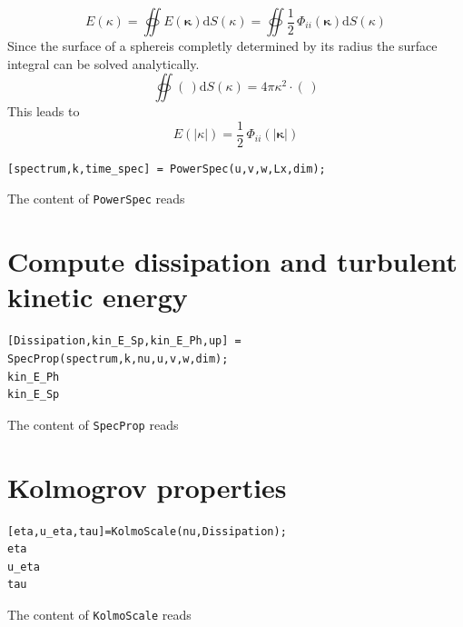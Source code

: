 \documentclass[preprint,12pt,ntfdMod]{elsarticle}
\begin{document}
\begin{par}

  \begin{equation}
      E(\kappa) = \oiint E(\boldsymbol\kappa)\mathrm{d}S(\kappa)
                = \oiint \frac{1}{2}\,\Phi_{ii}(\boldsymbol\kappa)\mathrm{d}S(\kappa)
  \end{equation}
  Since the surface of a sphereis completly determined by its radius the
  surface integral can be solved analytically.
  \begin{equation}
      \oiint(\,)\mathrm{d}S(\kappa) = 4\pi\kappa^2\cdot(\,)
  \end{equation}
This leads to
  \begin{equation}
      E(|\kappa|) = \frac{1}{2}\,\Phi_{ii}(|\boldsymbol\kappa|)
  \end{equation}

\end{par} \vspace{1em}
\begin{lstlisting}
[spectrum,k,time_spec] = PowerSpec(u,v,w,Lx,dim);
\end{lstlisting}
\begin{par}

The content of \verb|PowerSpec| reads


\end{par} \vspace{1em}


\section{Compute dissipation and turbulent kinetic energy}

\begin{lstlisting}
[Dissipation,kin_E_Sp,kin_E_Ph,up] = SpecProp(spectrum,k,nu,u,v,w,dim);
kin_E_Ph
kin_E_Sp
\end{lstlisting}
\begin{par}

The content of \verb|SpecProp| reads


\end{par} \vspace{1em}


\section{Kolmogrov properties}

\begin{lstlisting}
[eta,u_eta,tau]=KolmoScale(nu,Dissipation);
eta
u_eta
tau
\end{lstlisting}
\begin{par}

The content of \verb|KolmoScale| reads


\end{par} \vspace{1em}
\end{document}
